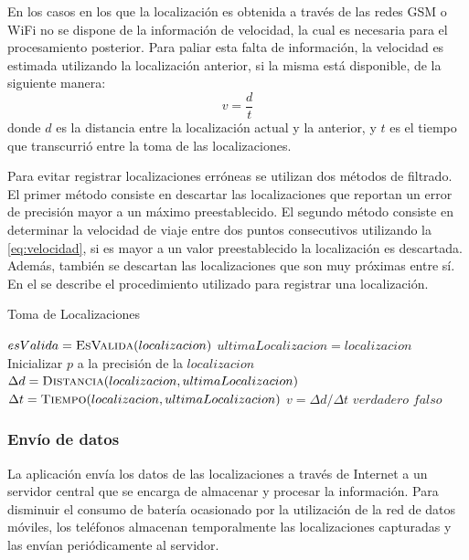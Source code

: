 En los casos en los que la localización es obtenida a través de las redes GSM o WiFi no se dispone de la información de velocidad, la cual es necesaria para el procesamiento posterior. Para paliar esta falta de información, la velocidad es estimada utilizando la localización anterior, si la misma está disponible, de la siguiente manera: \begin{equation} \label{eq:velocidad} v=\frac { d }{ t } \end{equation} donde $d$ es la distancia entre la localización actual y la anterior, y $t$ es el tiempo que transcurrió entre la toma de las localizaciones.

Para evitar registrar localizaciones erróneas se utilizan dos métodos de filtrado. El primer método consiste en descartar las localizaciones que reportan un error de precisión mayor a un máximo preestablecido. El segundo método consiste en determinar la velocidad de viaje entre dos puntos consecutivos utilizando la \cref{eq:velocidad}, si es mayor a un valor preestablecido la localización es descartada. Además, también se descartan las localizaciones que son muy próximas entre sí. En el  se describe el procedimiento utilizado para registrar una localización.

\begin{algorithm}
\caption{Toma de Localizaciones}
\label{alg:toma_de_localizaciones}
\begin{algorithmic}[1]
	\State $esValida = \Call{EsValida}{localizacion}$
		\State $ultimaLocalizacion = localizacion$
	\EndIf
\EndProcedure
\Statex
{}
	\State Inicializar $p$ a la precisión de la $localizacion$	
	\State $\Delta d = \Call{Distancia}{localizacion, ultimaLocalizacion}$
	\State $\Delta t = \Call{Tiempo}{localizacion, ultimaLocalizacion}$
	\State $v = \Delta d / \Delta t$
	    \State \Return $verdadero$
	\Else
	    \State \Return $falso$
	\EndIf
\EndFunction
\end{algorithmic}
\end{algorithm}

\subsubsection{Envío de datos}

La aplicación envía los datos de las localizaciones a través de Internet a un servidor central que se encarga de almacenar y procesar la información. Para disminuir el consumo de batería ocasionado por la utilización de la red de datos móviles, los teléfonos almacenan temporalmente las localizaciones capturadas y las envían periódicamente al servidor.

